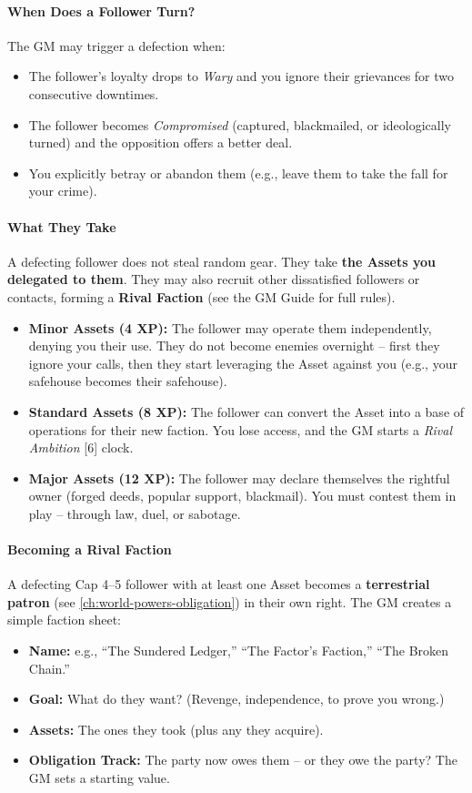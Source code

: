 \paragraph{When Does a Follower Turn?}
The GM may trigger a defection when:
\begin{itemize}
  \item The follower's loyalty drops to \emph{Wary} and you ignore their grievances for two consecutive downtimes.
  \item The follower becomes \emph{Compromised} (captured, blackmailed, or ideologically turned) and the opposition offers a better deal.
  \item You explicitly betray or abandon them (e.g., leave them to take the fall for your crime).
\end{itemize}

\paragraph{What They Take}
A defecting follower does not steal random gear. They take \textbf{the Assets you delegated to them}. They may also recruit other dissatisfied followers or contacts, forming a \textbf{Rival Faction} (see the GM Guide for full rules).

\begin{itemize}
  \item \textbf{Minor Assets (4 XP):} The follower may operate them independently, denying you their use. They do not become enemies overnight -- first they ignore your calls, then they start leveraging the Asset against you (e.g., your safehouse becomes their safehouse).
  \item \textbf{Standard Assets (8 XP):} The follower can convert the Asset into a base of operations for their new faction. You lose access, and the GM starts a \emph{Rival Ambition} [6] clock.
  \item \textbf{Major Assets (12 XP):} The follower may declare themselves the rightful owner (forged deeds, popular support, blackmail). You must contest them in play -- through law, duel, or sabotage.
\end{itemize}

\paragraph{Becoming a Rival Faction}
A defecting Cap 4--5 follower with at least one Asset becomes a \textbf{terrestrial patron} (see \ref{ch:world-powers-obligation}) in their own right. The GM creates a simple faction sheet:
\begin{itemize}
  \item \textbf{Name:} e.g., ``The Sundered Ledger,'' ``The Factor's Faction,'' ``The Broken Chain.''
  \item \textbf{Goal:} What do they want? (Revenge, independence, to prove you wrong.)
  \item \textbf{Assets:} The ones they took (plus any they acquire).
  \item \textbf{Obligation Track:} The party now owes them -- or they owe the party? The GM sets a starting value.
\end{itemize}

